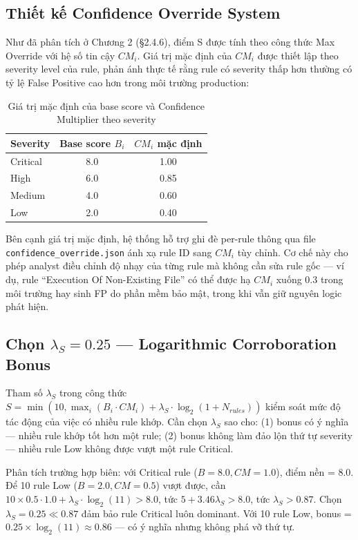 \documentclass[../main.tex]{subfiles}
\begin{document}
\subsection{Thiết kế Confidence Override System}
\label{subsection:3.4.1}

Như đã phân tích ở Chương 2 (§2.4.6), điểm S được tính theo công thức Max Override với hệ số tin cậy $CM_i$. Giá trị mặc định của $CM_i$ được thiết lập theo severity level của rule, phản ánh thực tế rằng rule có severity thấp hơn thường có tỷ lệ False Positive cao hơn trong môi trường production:

\begin{table}[h]
\centering
\begin{tabular}{|l|c|c|}
\hline
\textbf{Severity} & \textbf{Base score $B_i$} & \textbf{$CM_i$ mặc định} \\ \hline
Critical & 8.0 & 1.00 \\ \hline
High     & 6.0 & 0.85 \\ \hline
Medium   & 4.0 & 0.60 \\ \hline
Low      & 2.0 & 0.40 \\ \hline
\end{tabular}
\caption{Giá trị mặc định của base score và Confidence Multiplier theo severity}
\label{tab:sigma_defaults}
\end{table}

Bên cạnh giá trị mặc định, hệ thống hỗ trợ ghi đè per-rule thông qua file \texttt{confidence\_override.json} ánh xạ rule ID sang $CM_i$ tùy chỉnh. Cơ chế này cho phép analyst điều chỉnh độ nhạy của từng rule mà không cần sửa rule gốc — ví dụ, rule ``Execution Of Non-Existing File'' có thể được hạ $CM_i$ xuống 0.3 trong môi trường hay sinh FP do phần mềm bảo mật, trong khi vẫn giữ nguyên logic phát hiện.

\subsection{Chọn $\lambda_S = 0.25$ — Logarithmic Corroboration Bonus}
\label{subsection:3.4.2}

Tham số $\lambda_S$ trong công thức $S = \min(10, \max_i(B_i \cdot CM_i) + \lambda_S \cdot \log_2(1 + N_{rules}))$ kiểm soát mức độ tác động của việc có nhiều rule khớp. Cần chọn $\lambda_S$ sao cho: (1) bonus có ý nghĩa — nhiều rule khớp tốt hơn một rule; (2) bonus không làm đảo lộn thứ tự severity — nhiều rule Low không được vượt một rule Critical.

Phân tích trường hợp biên: với Critical rule ($B = 8.0, CM = 1.0$), điểm nền = 8.0. Để 10 rule Low ($B = 2.0, CM = 0.5$) vượt được, cần $10 \times 0.5 \cdot 1.0 + \lambda_S \cdot \log_2(11) > 8.0$, tức $5 + 3.46\lambda_S > 8.0$, tức $\lambda_S > 0.87$. Chọn $\lambda_S = 0.25 \ll 0.87$ đảm bảo rule Critical luôn dominant. Với 10 rule Low, bonus = $0.25 \times \log_2(11) \approx 0.86$ — có ý nghĩa nhưng không phá vỡ thứ tự.
\end{document}
